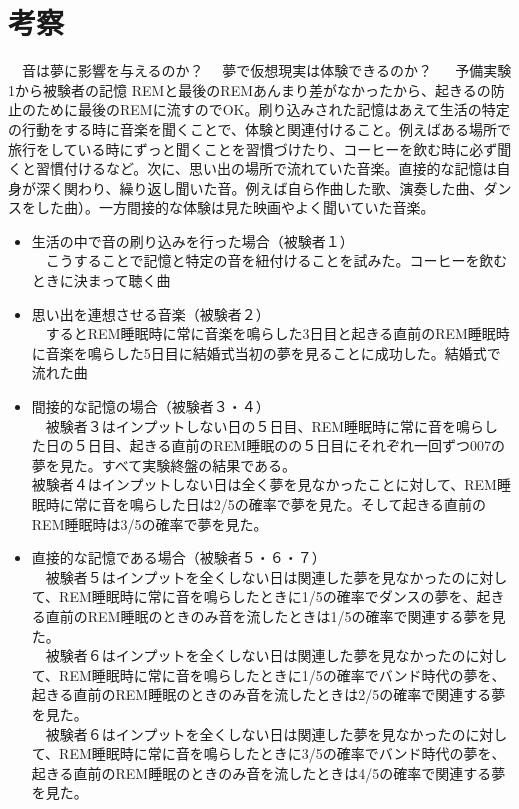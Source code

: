 \section{考察}
　音は夢に影響を与えるのか？
　夢で仮想現実は体験できるのか？
　
予備実験1から被験者の記憶
REMと最後のREMあんまり差がなかったから、起きるの防止のために最後のREMに流すのでOK。刷り込みされた記憶はあえて生活の特定の行動をする時に音楽を聞くことで、体験と関連付けること。例えばある場所で旅行をしている時にずっと聞くことを習慣づけたり、コーヒーを飲む時に必ず聞くと習慣付けるなど。次に、思い出の場所で流れていた音楽。直接的な記憶は自身が深く関わり、繰り返し聞いた音。例えば自ら作曲した歌、演奏した曲、ダンスをした曲）。一方間接的な体験は見た映画やよく聞いていた音楽。

\begin{itemize}
\item 生活の中で音の刷り込みを行った場合（被験者１）\\
　こうすることで記憶と特定の音を紐付けることを試みた。コーヒーを飲むときに決まって聴く曲

\item 思い出を連想させる音楽（被験者２）\\
　するとREM睡眠時に常に音楽を鳴らした3日目と起きる直前のREM睡眠時に音楽を鳴らした5日目に結婚式当初の夢を見ることに成功した。結婚式で流れた曲

\item 間接的な記憶の場合（被験者３・４）\\
　被験者３はインプットしない日の５日目、REM睡眠時に常に音を鳴らした日の５日目、起きる直前のREM睡眠のの５日目にそれぞれ一回ずつ007の夢を見た。すべて実験終盤の結果である。\\被験者４はインプットしない日は全く夢を見なかったことに対して、REM睡眠時に常に音を鳴らした日は2/5の確率で夢を見た。そして起きる直前のREM睡眠時は3/5の確率で夢を見た。

\item 直接的な記憶である場合（被験者５・６・７）\\
　被験者５はインプットを全くしない日は関連した夢を見なかったのに対して、REM睡眠時に常に音を鳴らしたときに1/5の確率でダンスの夢を、起きる直前のREM睡眠のときのみ音を流したときは1/5の確率で関連する夢を見た。\\
　被験者６はインプットを全くしない日は関連した夢を見なかったのに対して、REM睡眠時に常に音を鳴らしたときに1/5の確率でバンド時代の夢を、起きる直前のREM睡眠のときのみ音を流したときは2/5の確率で関連する夢を見た。\\
　被験者６はインプットを全くしない日は関連した夢を見なかったのに対して、REM睡眠時に常に音を鳴らしたときに3/5の確率でバンド時代の夢を、起きる直前のREM睡眠のときのみ音を流したときは4/5の確率で関連する夢を見た。
\end{itemize}


